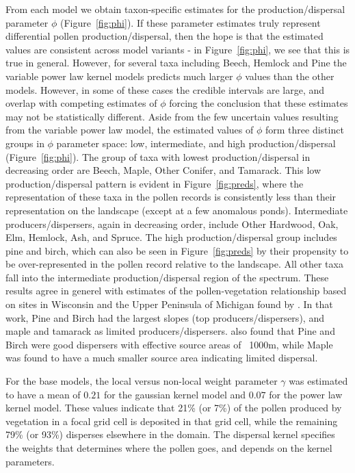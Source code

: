 \documentclass[12pt]{article}
\begin{document}
From each model we obtain taxon-specific estimates for the
production/dispersal parameter $\phi$ (Figure~\ref{fig:phi}). If these
parameter estimates truly represent differential pollen
production/dispersal, then the hope is that the estimated values are
consistent across model variants - in Figure~\ref{fig:phi}, we see
that this is true in general. However, for several taxa including
Beech, Hemlock and Pine the variable power law kernel models predicts
much larger $\phi$ values than the other models. However, in some of
these cases the credible intervals are large, and overlap with
competing estimates of $\phi$ forcing the conclusion that these
estimates may not be statistically different. Aside from the few
uncertain values resulting from the variable power law model, the
estimated values of $\phi$ form three distinct groups in $\phi$
parameter space: low, intermediate, and high production/dispersal
(Figure~\ref{fig:phi}). The group of taxa with lowest
production/dispersal in decreasing order are Beech, Maple, Other
Conifer, and Tamarack. This low production/dispersal pattern is
evident in Figure~\ref{fig:preds}, where the representation of these
taxa in the pollen records is consistently less than their
representation on the landscape (except at a few anomalous
ponds). Intermediate producers/dispersers, again in decreasing order,
include Other Hardwood, Oak, Elm, Hemlock, Ash, and Spruce. The
high production/dispersal group includes pine and birch, which can
also be seen in Figure~\ref{fig:preds} by their propensity to be
over-represented in the pollen record relative to the landscape. All
other taxa fall into the intermediate production/dispersal region of
the spectrum. These results agree in generel with estimates of the
pollen-vegetation relationship based on sites in Wisconsin and the
Upper Peninsula of Michigan found by \cite{prentice1986}. In that
work, Pine and Birch had the largest slopes (top
producers/dispersers), and maple and tamarack as limited
producers/dispersers. \cite{jackson1990} also found that Pine and
Birch were good dispersers with effective source areas of ~1000m,
while Maple was found to have a much smaller source area indicating
limited dispersal.

For the base models, the local versus non-local weight parameter
$\gamma$ was estimated to have a mean of $0.21$ for the gaussian
kernel model and $0.07$ for the power law kernel model. These values
indicate that 21\% (or 7\%) of the pollen produced by vegetation in a
focal grid cell is deposited in that grid cell, while the remaining
79\% (or 93\%) disperses elsewhere in the domain. The dispersal kernel
specifies the weights that determines where the pollen goes, and
depends on the kernel parameters. 
\end{document}

